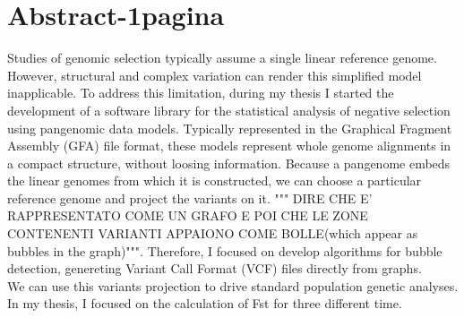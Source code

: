 
\chapter{Abstract-1pagina}
    

\label{Chapter0} %


\newcommand{\keyword}[1]{\textbf{#1}}
\newcommand{\tabhead}[1]{\textbf{#1}}
\newcommand{\code}[1]{\texttt{#1}}
\newcommand{\file}[1]{\texttt{\bfseries#1}}
\newcommand{\option}[1]{\texttt{\itshape#1}}

Studies of genomic selection typically assume a single linear reference genome. However, structural and complex variation can render this simplified model inapplicable. To address this limitation, during my thesis I started the development of a software library for the statistical analysis of negative selection using pangenomic data models. Typically represented in the Graphical Fragment Assembly (GFA) file format, these models represent whole genome alignments in a compact structure, without loosing information. Because a pangenome embeds the linear genomes from which it is constructed, we can choose a particular reference genome and project the variants on it. """ DIRE CHE E' RAPPRESENTATO COME UN GRAFO E POI CHE LE ZONE CONTENENTI VARIANTI APPAIONO COME BOLLE(which appear as bubbles in the graph)""". Therefore, I focused on develop algorithms for bubble detection, genereting Variant Call Format (VCF) files directly from graphs.\\

\noindent
We can use this variants projection to drive standard population genetic analyses. In my thesis, I focused on the calculation of Fst for three different time.

